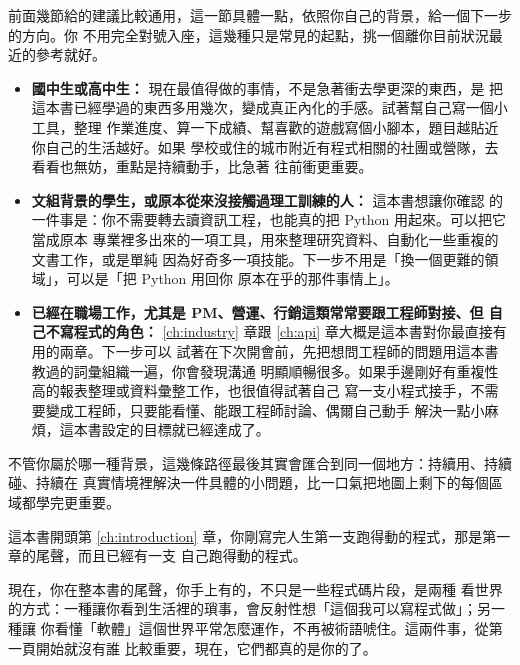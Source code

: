 前面幾節給的建議比較通用，這一節具體一點，依照你自己的背景，給一個下一步的方向。你
不用完全對號入座，這幾種只是常見的起點，挑一個離你目前狀況最近的參考就好。

\begin{itemize}
    \item \textbf{國中生或高中生：} 現在最值得做的事情，不是急著衝去學更深的東西，是
    把這本書已經學過的東西多用幾次，變成真正內化的手感。試著幫自己寫一個小工具，整理
    作業進度、算一下成績、幫喜歡的遊戲寫個小腳本，題目越貼近你自己的生活越好。如果
    學校或住的城市附近有程式相關的社團或營隊，去看看也無妨，重點是持續動手，比急著
    往前衝更重要。
    \item \textbf{文組背景的學生，或原本從來沒接觸過理工訓練的人：} 這本書想讓你確認
    的一件事是：你不需要轉去讀資訊工程，也能真的把 Python 用起來。可以把它當成原本
    專業裡多出來的一項工具，用來整理研究資料、自動化一些重複的文書工作，或是單純
    因為好奇多一項技能。下一步不用是「換一個更難的領域」，可以是「把 Python 用回你
    原本在乎的那件事情上」。
    \item \textbf{已經在職場工作，尤其是 PM、營運、行銷這類常常要跟工程師對接、但
    自己不寫程式的角色：} \ref{ch:industry} 章跟 \ref{ch:api} 章大概是這本書對你最直接有用的兩章。下一步可以
    試著在下次開會前，先把想問工程師的問題用這本書教過的詞彙組織一遍，你會發現溝通
    明顯順暢很多。如果手邊剛好有重複性高的報表整理或資料彙整工作，也很值得試著自己
    寫一支小程式接手，不需要變成工程師，只要能看懂、能跟工程師討論、偶爾自己動手
    解決一點小麻煩，這本書設定的目標就已經達成了。
\end{itemize}

不管你屬於哪一種背景，這幾條路徑最後其實會匯合到同一個地方：持續用、持續碰、持續在
真實情境裡解決一件具體的小問題，比一口氣把地圖上剩下的每個區域都學完更重要。

這本書開頭第 \ref{ch:introduction} 章，你剛寫完人生第一支跑得動的程式，那是第一章的尾聲，而且已經有一支
自己跑得動的程式。

現在，你在整本書的尾聲，你手上有的，不只是一些程式碼片段，是兩種
看世界的方式：一種讓你看到生活裡的瑣事，會反射性想「這個我可以寫程式做」；另一種讓
你看懂「軟體」這個世界平常怎麼運作，不再被術語唬住。這兩件事，從第一頁開始就沒有誰
比較重要，現在，它們都真的是你的了。
